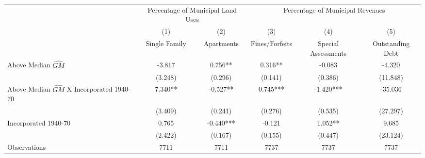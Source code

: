 \begin{tabular}{l*{5}{c}} \toprule
                    &\multicolumn{2}{c}{Percentage of Municipal Land Uses}&\multicolumn{3}{c}{Percentage of Municipal Revenues}\\\cmidrule(lr){2-3}\cmidrule(lr){4-6}
                    &\multicolumn{1}{c}{(1)}&\multicolumn{1}{c}{(2)}&\multicolumn{1}{c}{(3)}&\multicolumn{1}{c}{(4)}&\multicolumn{1}{c}{(5)}\\
                    &\multicolumn{1}{c}{Single Family}&\multicolumn{1}{c}{Apartments}&\multicolumn{1}{c}{Fines/Forfeits}&\multicolumn{1}{c}{Special Assessments}&\multicolumn{1}{c}{Outstanding Debt}\\
\midrule
Above Median $\widehat{GM}$&      -3.817   &       0.756** &       0.316** &      -0.083   &      -4.320   \\
                    &     (3.248)   &     (0.296)   &     (0.141)   &     (0.386)   &    (11.848)   \\
\addlinespace
Above Median $\widehat{GM}$ X Incorporated 1940-70&       7.340** &      -0.527** &       0.745***&      -1.420***&     -35.036   \\
                    &     (3.409)   &     (0.241)   &     (0.276)   &     (0.535)   &    (27.297)   \\
\addlinespace
Incorporated 1940-70&       0.765   &      -0.440***&      -0.121   &       1.052** &       9.685   \\
                    &     (2.422)   &     (0.167)   &     (0.155)   &     (0.447)   &    (23.124)   \\
\midrule
Observations        &        7711   &        7711   &        7737   &        7737   &        7737   \\
 \bottomrule \end{tabular}
